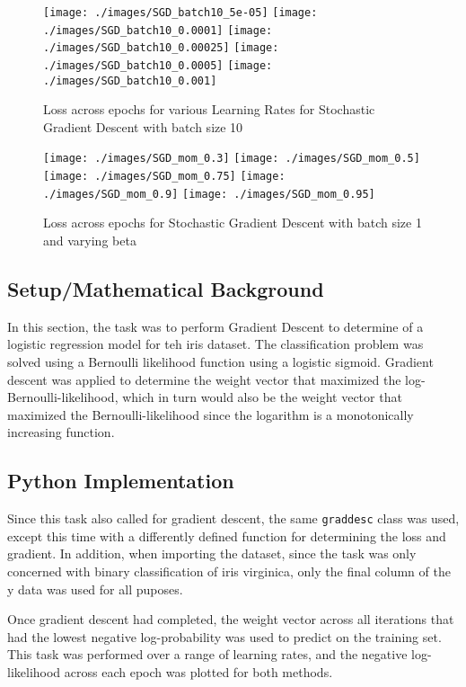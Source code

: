 \begin{figure}
\centering
\texttt{[image: ./images/SGD\_batch10\_5e-05]}
\texttt{[image: ./images/SGD\_batch10\_0.0001]}
\texttt{[image: ./images/SGD\_batch10\_0.00025]}
\texttt{[image: ./images/SGD\_batch10\_0.0005]}
\texttt{[image: ./images/SGD\_batch10\_0.001]}
\caption{Loss across epochs for various Learning Rates for Stochastic Gradient Descent with batch size 10}
\end{figure}

\begin{figure}
\centering
\texttt{[image: ./images/SGD\_mom\_0.3]}
\texttt{[image: ./images/SGD\_mom\_0.5]}
\texttt{[image: ./images/SGD\_mom\_0.75]}
\texttt{[image: ./images/SGD\_mom\_0.9]}
\texttt{[image: ./images/SGD\_mom\_0.95]}
\caption{Loss across epochs for Stochastic Gradient Descent with batch size 1 and varying beta}
\end{figure}



\subsection{Setup/Mathematical Background}
In this section, the task was to perform Gradient Descent to determine of a logistic regression model for teh iris dataset. The classification problem was solved using a Bernoulli likelihood function using a logistic sigmoid. Gradient descent was applied to determine the weight vector that maximized the log-Bernoulli-likelihood, which in turn would also be the weight vector that maximized the Bernoulli-likelihood since the logarithm is a monotonically increasing function.

\subsection{Python Implementation}
Since this task also called for gradient descent, the same \verb+graddesc+ class was used, except this time with a differently defined function for determining the loss and gradient. In addition, when importing the dataset, since the task was only concerned with binary classification of iris virginica, only the final column of the y data was used for all puposes.

Once gradient descent had completed, the weight vector across all iterations that had the lowest negative log-probability was used to predict on the training set. This task was performed over a range of learning rates, and the negative log-likelihood across each epoch was plotted for both methods.

